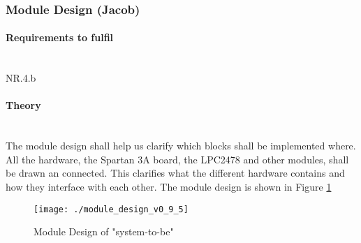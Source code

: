 \subsubsection{Module Design (Jacob)} 
\paragraph{Requirements to fulfil}\mbox{}\\
NR.4.b\\
\paragraph{Theory}\mbox{}\\
The module design shall help us clarify which blocks shall be implemented where. All the hardware, the Spartan 3A board, the LPC2478 and other modules, shall be drawn an connected. This clarifies what the different hardware contains and how they interface with each other. The module design is shown in Figure \ref{fig:module_design_v0_9}

\begin{landscape}
\begin{figure}[h!]
\texttt{[image: ./module\_design\_v0\_9\_5]}
\caption{Module Design of "system-to-be"}
\label{fig:module_design_v0_9}
\end{figure}
\end{landscape}

